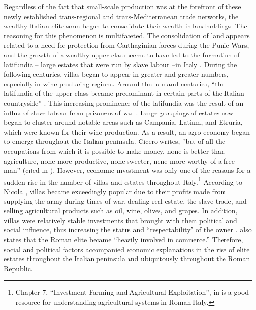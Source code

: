 Regardless of the fact that small-scale production was at the forefront of these newly established trans-regional and trans-Mediterranean trade networks, the wealthy Italian elite soon began to consolidate their wealth in landholdings. The reasoning for this phenomenon is multifaceted. The consolidation of land appears related to a need for protection from Carthaginian forces during the Punic Wars, and the growth of a wealthy upper class seems to have led to the formation of latifundia – large estates that were run by slave labour –in Italy \parencite[98--106]{Potter_1990}. 
During the following centuries, villas began to appear in greater and greater numbers, especially in wine-producing regions. Around the late  and  centuries\BC, 
“the latifundia of the upper class became predominant in certain parts of the Italian countryside” \parencite[12]{Moore_1995}. This increasing prominence of the latifundia was the result of an influx of slave labour from prisoners of war \parencite[178--179]{Kay_2014}.  Large groupings of estates now began to cluster around notable areas such as Campania, Latium, and Etruria, which were known for their wine production. As a result, an agro-economy began to emerge throughout the Italian peninsula. Cicero writes, “but of all the occupations from which it is possible to make money, none is better than agriculture, none more productive, none sweeter, none more worthy of a free man” (cited in \textcite[133]{Kay_2014}). However, economic investment was only one of the reasons for a sudden rise in the number of villas and estates throughout Italy.\footnote{Chapter 7, “Investment Farming and Agricultural Exploitation”, in \textcite{Kay_2014} is a good resource for understanding agricultural systems in Roman Italy.} According to Nicola \textcite[29]{Terrenato_2001}, villas became exceedingly popular due to their profits made from supplying the army during times of war, dealing real-estate, the slave trade, and selling agricultural products such as oil, wine, olives, and grapes. In addition, villas were relatively stable investments that brought with them political and social influence, thus increasing the status and “respectability” of the owner \parencite[29]{Terrenato_2001}. \textcite[119]{Storey_2004} also states that the Roman elite became “heavily involved in commerce.” Therefore, social and political factors accompanied economic explanations in the rise of elite estates throughout the Italian peninsula and ubiquitously throughout the Roman Republic.


